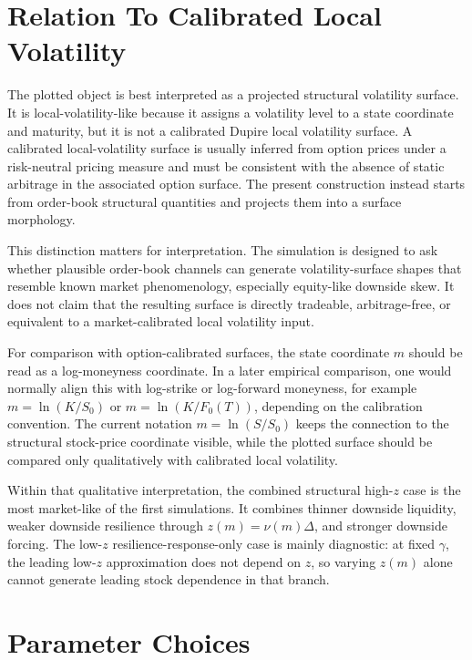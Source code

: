 \documentclass[11pt]{article}
\begin{document}
\section{Relation To Calibrated Local Volatility}

The plotted object is best interpreted as a projected structural volatility
surface. It is local-volatility-like because it assigns a volatility level to
a state coordinate and maturity, but it is not a calibrated Dupire local
volatility surface. A calibrated local-volatility surface is usually inferred
from option prices under a risk-neutral pricing measure and must be consistent
with the absence of static arbitrage in the associated option surface. The
present construction instead starts from order-book structural quantities and
projects them into a surface morphology.

This distinction matters for interpretation. The simulation is designed to
ask whether plausible order-book channels can generate volatility-surface
shapes that resemble known market phenomenology, especially equity-like
downside skew. It does not claim that the resulting surface is directly
tradeable, arbitrage-free, or equivalent to a market-calibrated local
volatility input.

For comparison with option-calibrated surfaces, the state coordinate \(m\)
should be read as a log-moneyness coordinate. In a later empirical comparison,
one would normally align this with log-strike or log-forward moneyness, for
example \(m=\ln(K/S_0)\) or \(m=\ln(K/F_0(T))\), depending on the calibration
convention. The current notation \(m=\ln(S/S_0)\) keeps the connection to the
structural stock-price coordinate visible, while the plotted surface should
be compared only qualitatively with calibrated local volatility.

Within that qualitative interpretation, the combined structural high-\(z\)
case is the most market-like of the first simulations. It combines thinner
downside liquidity, weaker downside resilience through \(z(m)=\nu(m)\Delta\),
and stronger downside forcing. The low-\(z\) resilience-response-only case is
mainly diagnostic: at fixed \(\gamma\), the leading low-\(z\) approximation
does not depend on \(z\), so varying \(z(m)\) alone cannot generate leading
stock dependence in that branch.

\section{Parameter Choices}
\end{document}
